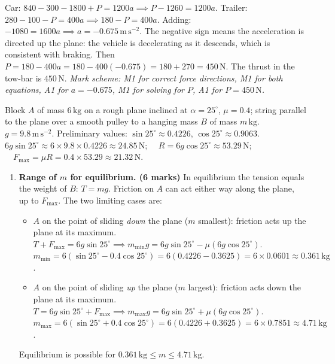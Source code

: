 \documentclass[11pt]{article}
\begin{document}
\begin{corrige}
\begin{enumerate}
Car: $840 - 300 - 1800 + P = 1200a \implies P - 1260 = 1200a$.
Trailer: $280 - 100 - P = 400a \implies 180 - P = 400a$.
Adding: $-1080 = 1600a \implies a = -0.675\,\mathrm{m\,s^{-2}}$.
The negative sign means the acceleration is directed up the plane: the vehicle is decelerating as it descends, which is consistent with braking.
Then $P = 180 - 400a = 180 - 400(-0.675) = 180 + 270 = 450\,\mathrm{N}$.
The thrust in the tow-bar is $450\,\mathrm{N}$.
\textit{Mark scheme: M1 for correct force directions, M1 for both equations, A1 for $a = -0.675$, M1 for solving for $P$, A1 for $P = 450\,\mathrm{N}$.}
\end{enumerate}
\end{corrige}

\begin{corrige}
Block $A$ of mass $6\,\mathrm{kg}$ on a rough plane inclined at $\alpha = 25^\circ$, $\mu = 0.4$; string parallel to the plane over a smooth pulley to a hanging mass $B$ of mass $m\,\mathrm{kg}$. $g = 9.8\,\mathrm{m\,s^{-2}}$.
Preliminary values: $\sin25^\circ \approx 0.4226$, $\cos25^\circ \approx 0.9063$.
$6g\sin25^\circ \approx 6\times 9.8\times 0.4226 \approx 24.85\,\mathrm{N}$; $\quad R = 6g\cos25^\circ \approx 53.29\,\mathrm{N}$; $\quad F_{\max} = \mu R = 0.4\times 53.29 \approx 21.32\,\mathrm{N}$.
\begin{enumerate}
\item[(a)] \textbf{Range of $m$ for equilibrium. (6 marks)}
In equilibrium the tension equals the weight of $B$: $T = mg$. Friction on $A$ can act either way along the plane, up to $F_{\max}$. The two limiting cases are:
\begin{itemize}
\item $A$ on the point of sliding \emph{down} the plane ($m$ smallest): friction acts up the plane at its maximum.
$T + F_{\max} = 6g\sin25^\circ \implies m_{\min}g = 6g\sin25^\circ - \mu(6g\cos25^\circ)$.
$m_{\min} = 6(\sin25^\circ - 0.4\cos25^\circ) = 6(0.4226 - 0.3625) = 6\times 0.0601 \approx 0.361\,\mathrm{kg}$.
\item $A$ on the point of sliding \emph{up} the plane ($m$ largest): friction acts down the plane at its maximum.
$T = 6g\sin25^\circ + F_{\max} \implies m_{\max}g = 6g\sin25^\circ + \mu(6g\cos25^\circ)$.
$m_{\max} = 6(\sin25^\circ + 0.4\cos25^\circ) = 6(0.4226 + 0.3625) = 6\times 0.7851 \approx 4.71\,\mathrm{kg}$.
\end{itemize}
Equilibrium is possible for $0.361\,\mathrm{kg} \le m \le 4.71\,\mathrm{kg}$.

\end{enumerate}
\end{corrige}
\end{document}
